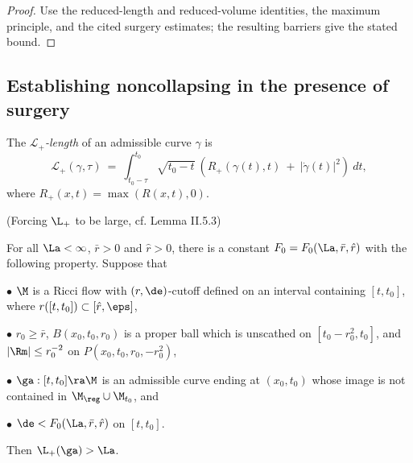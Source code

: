 \begin{proof}
\sketch Use the reduced-length and reduced-volume identities, the maximum principle, and the cited surgery estimates; the resulting barriers give the stated bound.
\end{proof}

\subsection{Establishing noncollapsing in the presence of surgery}
\label{II.5.2section}

\begin{definition}
  \label{def:kl-establishing-noncollapsing-presence-surgery-noncollapsing-definition}

The {\em ${\mathcal L}_+$-length} of an admissible curve $\gamma$ is
\begin{equation}
{\mathcal L}_+(\gamma, \tau) \: = \:
\int_{t_0 - \tau}^{t_0} \sqrt{t_0 - t} \: \left(
R_+(\gamma(t), t) \: + \: |\dot{\gamma}(t)|^2 \right) \: dt,
\end{equation}
where $R_+(x,t) = \max(R(x,t), 0)$.
\end{definition}

\begin{lemma}
  \label{lem:kl-establishing-noncollapsing-presence-surgery-existence-noncollapsing}
(Forcing $\L_+$ to be large, cf. Lemma II.5.3)
\label{lplusbig}

For all $\La< \infty$, $\bar r>0$ and $\hat r>0$,
there is  a constant  $F_0=F_0(\La,\bar r,\hat r)$
with the following property.  Suppose that

$\bullet$  $\M$ is a Ricci flow  with $(r,\de)$-cutoff
defined on an interval containing $[t,t_0]$, where
 $r([t,t_0])\subset [\hat r,\eps]$,

$\bullet$ $r_0\geq \bar r$,
 $B(x_0,t_0,r_0)$ is a proper ball which is unscathed on $[t_0-r_0^2,t_0]$, and
$|\Rm|\leq r_0^{-2}$ on $P(x_0,t_0,r_0,-r_0^2)$,

$\bullet$ $\ga:[t,t_0]\ra\M$ is an admissible curve
ending at $(x_0, t_0)$
whose image
is not contained in $\M_{\reg}\cup\M_{t_0}$, and

$\bullet$ $\de < F_0(\La,\bar r,\hat r)$
on $[t,t_0]$.

\noindent
Then $\L_+(\ga)>\La$.
\end{lemma}

